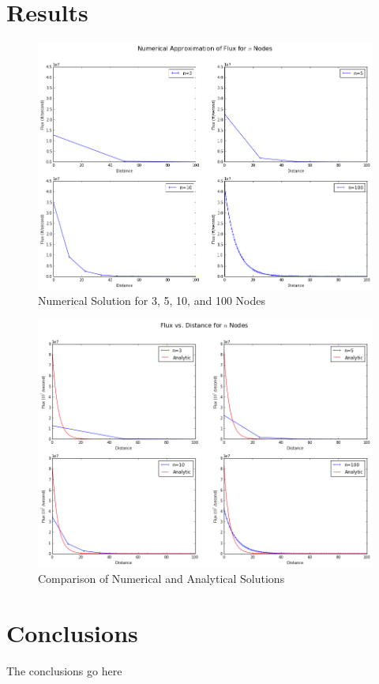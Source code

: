 \documentclass[10pt,peerreviewca,onecolumn]{IEEEtran} %
\begin{document}
	\section{Results}
	\begin{figure}[h]
		\includegraphics[width=7in]{curve_vs_number_of_nodes}
		\caption{Numerical Solution for 3, 5, 10, and 100 Nodes}
		\label{fig:numnodes}
	\end{figure}

	\begin{figure}[h]
		\includegraphics[width=7in]{analytic_vs_numerical}
		\caption{Comparison of Numerical and Analytical Solutions}
		\label{fig:numerical_vs_analytical}
	\end{figure}
	
	\section{Conclusions}
	The conclusions go here
\end{document}
